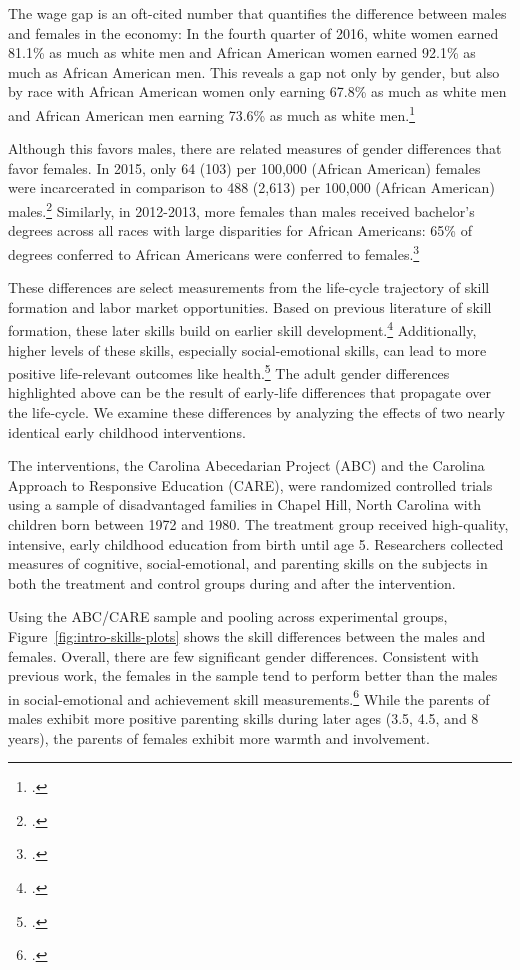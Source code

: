 The wage gap is an oft-cited number that quantifies the difference between males and females in the economy: In the fourth quarter of 2016, white women earned 81.1\% as much as white men and African American women earned 92.1\% as much as African American men. This reveals a gap not only by gender, but also by race with African American women only earning 67.8\% as much as white men and African American men earning 73.6\% as much as white men.\footnote{\citet{USDPTL_2017_Wage_News-Release}.}

 Although this favors males, there are related measures of gender differences that favor females. In 2015, only 64 (103) per 100,000 (African American) females were incarcerated in comparison to 488 (2,613) per 100,000 (African American) males.\footnote{\citet{UDOJ_2016_PrisonersStatistics_Bulletin}.} Similarly, in 2012-2013, more females than males received bachelor's degrees across all races with large disparities for African Americans: 65\% of degrees conferred to African Americans were conferred to females.\footnote{\citet{UDOE_2016_Statistics_Report}.}

These differences are select measurements from the life-cycle trajectory of skill formation and labor market opportunities. Based on previous literature of skill formation, these later skills build on earlier skill development.\footnote{\citet{Cunha_Heckman_etal_2010_est_tech_cognoncog}.} Additionally, higher levels of these skills, especially social-emotional skills, can lead to more positive life-relevant outcomes like health.\footnote{\citet{Conti_etal_2016_LongTermHealth}.} The adult gender differences highlighted above can be the result of early-life differences that propagate over the life-cycle. We examine these differences by analyzing the effects of two nearly identical early childhood interventions. 

The interventions, the Carolina Abecedarian Project (ABC) and the Carolina Approach to Responsive Education (CARE), were randomized controlled trials using a sample of disadvantaged families in Chapel Hill, North Carolina with children born between 1972 and 1980. The treatment group received high-quality, intensive, early childhood education from birth until age 5. Researchers collected measures of cognitive, social-emotional, and parenting skills on the subjects in both the treatment and control groups during and after the intervention. 

Using the ABC/CARE sample and pooling across experimental groups, Figure~\ref{fig:intro-skills-plots} shows the skill differences between the males and females. Overall, there are few significant gender differences. Consistent with previous work, the females in the sample tend to perform better than the males in social-emotional and achievement skill measurements.\footnote{\citet{Baker-Milligan_2013_Boy-Girl-Differences}.} While the parents of males exhibit more positive parenting skills during later ages (3.5, 4.5, and 8 years), the parents of females exhibit more warmth and involvement.

